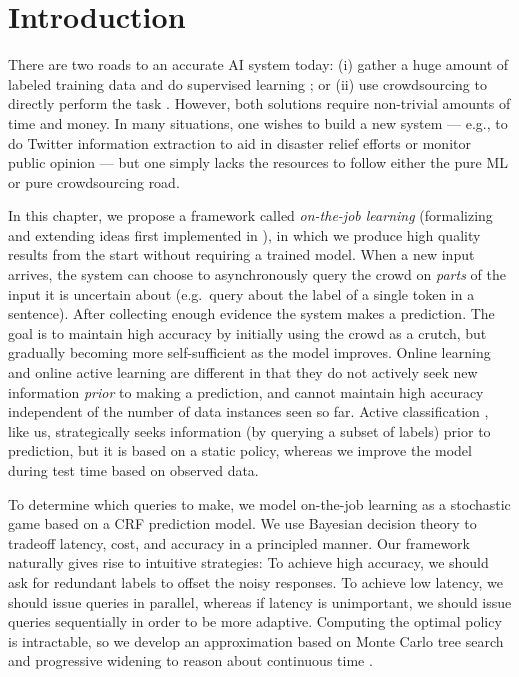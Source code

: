 \section{Introduction}
\label{sec:otj:intro}

There are two roads to an accurate AI system today:
(i) gather a huge amount of labeled training data \citep{deng2009imagenet} and do supervised learning \citep{krizhevsky2012imagenet};
or (ii) use crowdsourcing to directly perform the task \citep{bernstein2010soylent,kokkalis2013emailvalet}.
However, both solutions require non-trivial amounts of time and money.
In many situations, one wishes to build a new system --- e.g., to do Twitter information extraction
\citep{li2012twiner} to aid in disaster relief efforts or monitor public
opinion --- but one simply lacks the resources to follow either the pure ML or pure crowdsourcing road.

In this chapter, we propose a framework called \emph{on-the-job learning} (formalizing and extending ideas first implemented in \citet{lasecki2013realtime}),
in which we produce high quality results from the start without requiring a trained model.
When a new input arrives,
the system can choose to asynchronously query the crowd on \emph{parts} of the input it is
uncertain about (e.g.\ query about the label of a single token in a sentence). After collecting enough evidence the system makes a prediction.
The goal is to maintain high accuracy by initially using the crowd as a crutch,
but gradually becoming more self-sufficient as the model improves.
Online learning \citep{cesabianchi06prediction} and
online active learning \citep{helmbold1997some,sculley2007online,chu2011unbiased}
are different in that
they do not actively seek new information \emph{prior} to making a prediction,
and cannot maintain high accuracy independent of the number of data instances seen so far.
Active classification \citep{gao2011active}, like us,
strategically seeks information (by querying a subset of labels) prior to prediction,
but it is based on a static policy, 
whereas we improve the model during test time based on observed data.

To determine which queries to make,
we model on-the-job learning as a stochastic game based on a CRF prediction model.
We use Bayesian decision theory to tradeoff latency, cost, and accuracy in a principled manner.
Our framework naturally gives rise to intuitive strategies:
To achieve high accuracy, we should ask for redundant labels
to offset the noisy responses.  To achieve low latency, we should issue queries
in parallel, whereas if latency is unimportant, we should issue queries
sequentially in order to be more adaptive.
Computing the optimal policy is intractable,
so we develop an approximation
based on Monte Carlo tree search \citep{kocsis2006bandit} and
progressive widening to reason about continuous time \citep{coulom2007computing}.

